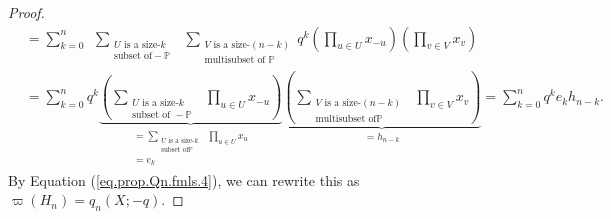 \documentclass[revision]{FPSAC2024}
\begin{document}
\begin{proof}
\begin{align*}
&  =\sum_{k=0}^{n}\ \ \sum_{\substack{U\text{ is a size-}k\\\text{subset of
}-\mathbb{P}}}\ \ \sum_{\substack{V\text{ is a size-}\left(  n-k\right)
\\\text{multisubset of }\mathbb{P}}}q^{k}\left(  \prod_{u\in U}x_{-u}\right)
\left(  \prod_{v\in V}x_{v}\right) \\
&  =\sum_{k=0}^{n}q^{k}\underbrace{\left(  \sum_{\substack{U\text{ is a
size-}k\\\text{subset of }-\mathbb{P}}}\ \ \prod_{u\in U}x_{-u}\right)
}_{\substack{=\sum_{\substack{U\text{ is a size-}k\\\text{subset of
}\mathbb{P}}}\ \ \prod_{u\in U}x_{u}\\=e_{k}}}\underbrace{\left(
\sum_{\substack{V\text{ is a size-}\left(  n-k\right)  \\\text{multisubset of
}\mathbb{P}}}\ \ \prod_{v\in V}x_{v}\right)  }_{=h_{n-k}}
=\sum_{k=0}^{n}q^{k}e_{k}h_{n-k} .
\end{align*}
By Equation (\ref{eq.prop.Qn.fmls.4}), we can rewrite this
as $\varpi\left(H_n\right) = q_{n}(X;-q)$.
\end{proof}





\end{document}
